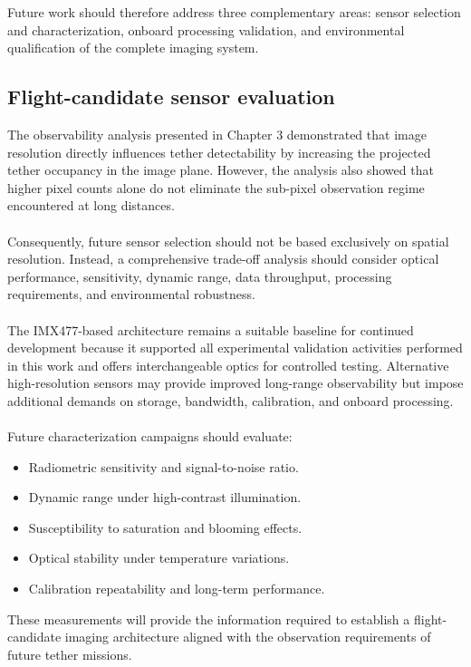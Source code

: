 Future work should therefore address three complementary areas: sensor selection and characterization, onboard processing validation, and environmental qualification of the complete imaging system.

\subsection{Flight-candidate sensor evaluation}

The observability analysis presented in Chapter 3 demonstrated that image resolution directly influences tether detectability by increasing the projected tether occupancy in the image plane. However, the analysis also showed that higher pixel counts alone do not eliminate the sub-pixel observation regime encountered at long distances.
\\\\
Consequently, future sensor selection should not be based exclusively on spatial resolution. Instead, a comprehensive trade-off analysis should consider optical performance, sensitivity, dynamic range, data throughput, processing requirements, and environmental robustness.
\\\\
The IMX477-based architecture remains a suitable baseline for continued development because it supported all experimental validation activities performed in this work and offers interchangeable optics for controlled testing. Alternative high-resolution sensors may provide improved long-range observability but impose additional demands on storage, bandwidth, calibration, and onboard processing.
\\\\
Future characterization campaigns should evaluate:
\begin{itemize}
    \item Radiometric sensitivity and signal-to-noise ratio.
    \item Dynamic range under high-contrast illumination.
    \item Susceptibility to saturation and blooming effects.
    \item Optical stability under temperature variations.
    \item Calibration repeatability and long-term performance.
\end{itemize}

These measurements will provide the information required to establish a flight-candidate imaging architecture aligned with the observation requirements of future tether missions.


